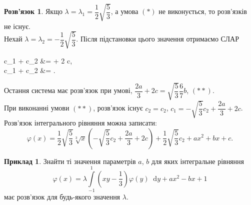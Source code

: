\documentclass[a4paper, 12pt]{book}
\theoremstyle{definition}
\newtheorem{example}{Приклад}
\newtheorem*{solution*}{Розв'язок}
\newcommand*\diff{\mathop{}\!\mathrm{d}}
\renewcommand{\phi}{\varphi}
\newcommand{\Int}{\displaystyle\int\limits}
\newenvironment{system*}{\begin{equation*} \left\{\begin{aligned}}{\end{aligned} \right. \end{equation*}}
\begin{document}
\begin{solution*}
	Якщо $\lambda = \lambda_1 = \dfrac{1}{2} \sqrt{\dfrac{5}{3}}$, а умова $(*)$ не виконується, то розв'язків не існує. \\

	Нехай $\lambda = \lambda_2 = - \dfrac{1}{2} \sqrt{\dfrac{5}{3}}$. Після підстановки цього значення отримаємо СЛАР
	\begin{system*}
		c_1 +  c_2 &=  + 2 c, \\
		c_1 +  c_2 &=  .
	\end{system*}

	Остання система має розв'язок при умові, $\dfrac{2a}{3} + 2c = \sqrt{\dfrac{5}{3}} \dfrac{6}{7} b$, $(**)$. \\

	При виконанні умови $(**)$, розв’язок існує $c_2 = c_2$, $c_1 = - \sqrt{\dfrac{5}{3}} c_2 + \dfrac{2a}{3} + 2c$. \\

	Розв'язок інтегрального рівняння можна записати: \[ \phi(x) = \dfrac{1}{2} \sqrt{\dfrac{5}{3}} \sqrt[3]{x} \left( -\sqrt{\dfrac{5}{3}} c_2 + \dfrac{2a}{3} + 2c \right) + \dfrac{1}{2} \sqrt{\dfrac{5}{3}} c_2 + ax^2 + bx + c. \]
\end{solution*}

\newpage

\begin{example}
	Знайти ті значення параметрів $a$, $b$ для яких інтегральне рівняння \[\phi(x) = \lambda \Int_{-1}^1 \left( xy - \dfrac{1}{3} \right) \phi(y) \diff y + ax^2 - bx + 1 \] має розв'язок для будь-якого значення $\lambda$.
\end{example}
\end{document}
